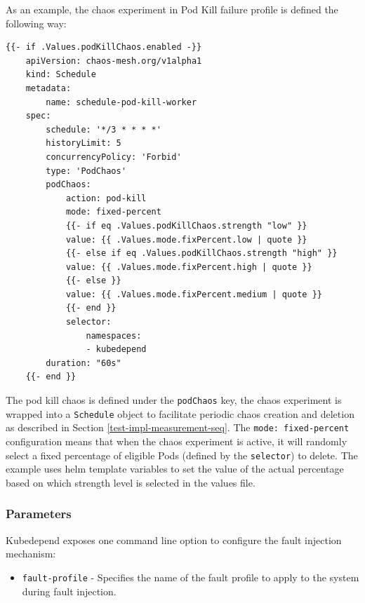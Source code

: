 As an example, the chaos experiment in Pod Kill failure profile is defined the following way:

\vspace{0.5cm}
\begin{minipage}{\linewidth}
	\begin{lstlisting}[caption={Pod Kill chaos}, label={lst:pod-kill-chaos}]
	{{- if .Values.podKillChaos.enabled -}}
	apiVersion: chaos-mesh.org/v1alpha1
	kind: Schedule
	metadata:
		name: schedule-pod-kill-worker
	spec:
		schedule: '*/3 * * * *'
		historyLimit: 5
		concurrencyPolicy: 'Forbid'
		type: 'PodChaos'
		podChaos:
			action: pod-kill
			mode: fixed-percent
			{{- if eq .Values.podKillChaos.strength "low" }}
			value: {{ .Values.mode.fixPercent.low | quote }}
			{{- else if eq .Values.podKillChaos.strength "high" }}
			value: {{ .Values.mode.fixPercent.high | quote }}
			{{- else }}
			value: {{ .Values.mode.fixPercent.medium | quote }}
			{{- end }}
			selector:
				namespaces:
				- kubedepend
		duration: "60s"
	{{- end }}\end{lstlisting}
\end{minipage}

The pod kill chaos is defined under the \texttt{podChaos} key, the chaos experiment is wrapped into a \texttt{Schedule} object to facilitate periodic chaos creation and deletion as described in Section \ref{test-impl-measurement-seq}. The \texttt{mode: fixed-percent} configuration means that when the chaos experiment is active, it will randomly select a fixed percentage of eligible Pods (defined by the \texttt{selector}) to delete. The example uses helm template variables to set the value of the actual percentage based on which strength level is selected in the values file.

\subsubsection{Parameters}

Kubedepend exposes one command line option to configure the fault injection mechanism:

\begin{itemize}
	\item \texttt{fault-profile} - Specifies the name of the fault profile to apply to the system during fault injection.
\end{itemize}

